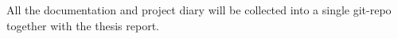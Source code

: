 All the documentation and project diary will be collected into a single git-repo together with the thesis report. 


